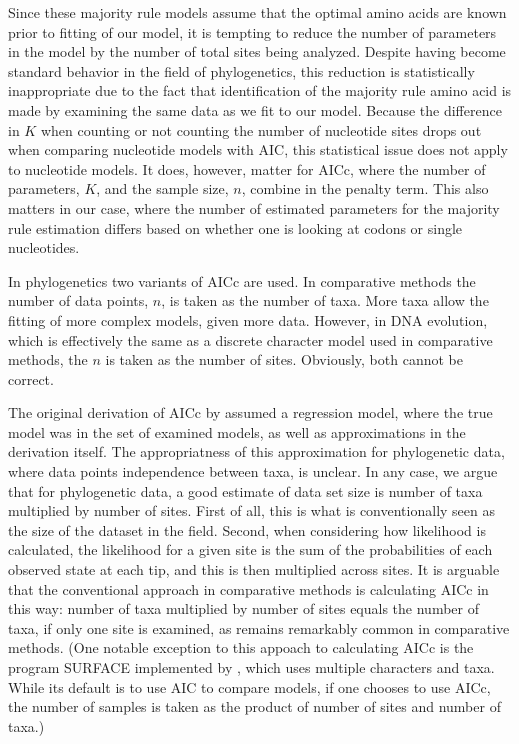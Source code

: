 \documentclass[12pt,letterpaper]{article}
\begin{document}
Since these majority rule models assume that the optimal amino acids are known prior to fitting of our model, it is tempting to reduce the number of parameters in the model by the number of total sites being analyzed.
Despite having become standard behavior in the field of phylogenetics, this reduction is statistically inappropriate due to the fact that identification of the majority rule amino acid is made by examining the same data as we fit to our model.
Because the difference in $K$ when counting or not counting the number of nucleotide sites drops out when comparing nucleotide models with AIC, this statistical issue does not apply to nucleotide models.
It does, however, matter for AICc, where the number of parameters, $K$, and the sample size, $n$, combine in the penalty term.
This also matters in our case, where the number of estimated parameters for the majority rule estimation differs based on whether one is looking at codons or single nucleotides.

In phylogenetics two variants of AICc are used.
In comparative methods \citep[e.g.~][]{ButlerKing2004, OMearaetal2006, BeaulieuEtAl2013} the number of data points, $n$, is taken as the number of taxa.
More taxa allow the fitting of more complex models, given more data.
However, in DNA evolution, which is effectively the same as a discrete character model used in comparative methods, the $n$ is taken as the number of sites.
Obviously, both cannot be correct.

The original derivation of AICc by \citet{HurvichTsai1989} assumed a regression model, where the true model was in the set of examined models, as well as approximations in the derivation itself.
The appropriatness of this approximation for phylogenetic data, where data points independence between taxa, is unclear.
In any case, we argue that for phylogenetic data, a good estimate of data set size is number of taxa multiplied by number of sites.
First of all, this is what is conventionally seen as the size of the dataset in the field.
Second, when considering how likelihood is calculated, the likelihood for a given site is the sum of the probabilities of each observed state at each tip, and this is then multiplied across sites.
It is arguable that the conventional approach in comparative methods is calculating AICc in this way: number of taxa multiplied by number of sites equals the number of taxa, if only one site is examined, as remains remarkably common in comparative methods.
(One notable exception to this appoach to calculating AICc is the program SURFACE implemented by \citet{IngramMahler2013}, which uses multiple characters and taxa.
While its default is to use AIC to compare models, if one chooses to use AICc, the number of samples is taken as the product of number of sites and number of taxa.)
\end{document}
